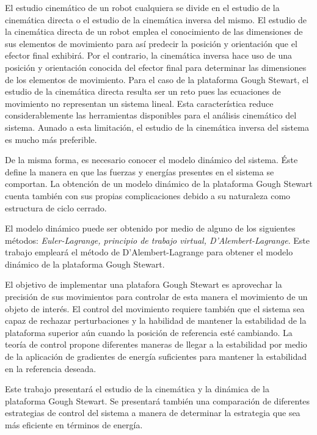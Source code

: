 El estudio cinemático de un robot cualquiera se divide
en el estudio de la cinemática directa o el estudio de 
la cinemática inversa del mismo.
El estudio de la cinemática directa de un robot
emplea el conocimiento de las dimensiones de sus
elementos de movimiento para así predecir 
la posición y orientación
que el efector final exhibirá. 
Por el contrario, la cinemática inversa hace uso de 
una posición y orientación conocida del efector
final para determinar las dimensiones de los elementos 
de movimiento.
Para el caso de la plataforma Gough Stewart, 
el estudio de la cinemática directa resulta
ser un reto pues las ecuaciones de movimiento
no representan un sistema lineal. 
Esta característica reduce considerablemente
las herramientas disponibles para el análisis
cinemático del sistema.
Aunado a esta limitación, el estudio de la 
cinemática inversa del sistema es mucho más preferible.

De la misma forma, es necesario conocer el modelo dinámico 
del sistema. 
Éste define la manera en que las fuerzas y energías
presentes en el sistema se comportan.
La obtención de un modelo dinámico de la 
plataforma Gough Stewart
cuenta también con sus propias complicaciones
debido a su naturaleza como estructura de ciclo cerrado.

El modelo dinámico puede ser obtenido 
por medio de alguno de los siguientes métodos: 
\emph{Euler-Lagrange, principio de trabajo virtual, 
D'Alembert-Lagrange}. 
Este trabajo empleará el método de D'Alembert-Lagrange
para obtener el modelo dinámico de la plataforma 
Gough Stewart.

El objetivo de implementar una platafora Gough Stewart es
aprovechar la precisión de sus movimientos para 
controlar de esta manera el movimiento de un objeto de 
interés. El control del  movimiento requiere también
que el sistema sea capaz de rechazar perturbaciones
y la habilidad de mantener la estabilidad de la 
plataforma superior aún cuando la posición de referencia
esté cambiando. La teoría de control 
propone diferentes maneras de llegar a la estabilidad por 
medio de la aplicación de gradientes de energía suficientes 
para mantener la estabilidad en la referencia deseada.

Este trabajo presentará el estudio de la cinemática
 y la dinámica de la plataforma Gough Stewart. 
 Se presentará también una comparación de diferentes 
 estrategias de control del sistema a manera 
 de determinar la estrategia que sea más 
 eficiente en términos de energía.
